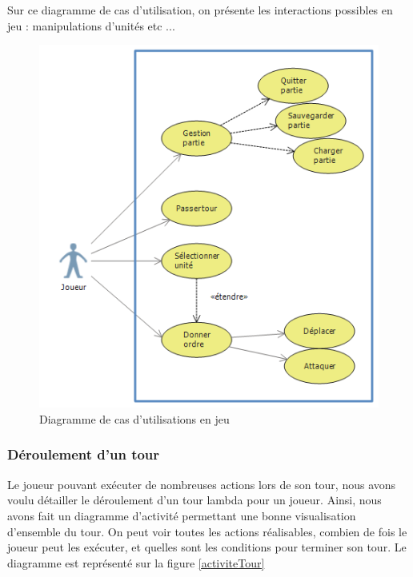Sur ce diagramme de cas d'utilisation, on présente les interactions possibles en jeu : manipulations d'unités etc ...
\begin{figure}
	\centering
		\includegraphics[width=\textwidth]{img/ucd_ig.png}
		 \caption{\label{étiquette} Diagramme de cas d'utilisations en jeu}
	\label{casdut2}
\end{figure}

\subsubsection{Déroulement d'un tour}
Le joueur pouvant exécuter de nombreuses actions lors de son tour, nous avons voulu détailler le déroulement d'un tour lambda pour un joueur. Ainsi, nous avons fait un diagramme d'activité permettant une bonne visualisation d'ensemble du tour. On peut voir toutes les actions réalisables, combien de fois le joueur peut les exécuter, et quelles sont les conditions pour terminer son tour. Le diagramme est représenté sur la figure \ref{activiteTour}

